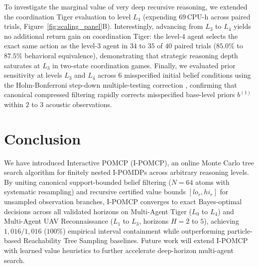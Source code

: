 To investigate the marginal value of very deep recursive reasoning, we extended the coordination Tiger evaluation to level $L_4$ (expending $69\,\text{CPU-h}$ across paired trials, Figure~\ref{fig:scaling_panel}B). Interestingly, advancing from $L_3$ to $L_4$ yields no additional return gain on coordination Tiger: the level-$4$ agent selects the exact same action as the level-$3$ agent in $34$ to $35$ of $40$ paired trials ($85.0\%$ to $87.5\%$ behavioral equivalence), demonstrating that strategic reasoning depth saturates at $L_3$ in two-state coordination games. Finally, we evaluated prior sensitivity at levels $L_3$ and $L_4$ across $6$ misspecified initial belief conditions using the Holm-Bonferroni step-down multiple-testing correction \citep{holm1979simple}, confirming that canonical compressed filtering rapidly corrects misspecified base-level priors $b^{(1)}$ within $2$ to $3$ acoustic observations.

\section{Conclusion}
\label{sec:conclusion}

We have introduced Interactive POMCP (I-POMCP), an online Monte Carlo tree search algorithm for finitely nested I-POMDPs across arbitrary reasoning levels. By uniting canonical support-bounded belief filtering ($N=64$ atoms with systematic resampling) and recursive certified value bounds $[lo_r, hi_r]$ for unsampled observation branches, I-POMCP converges to exact Bayes-optimal decisions across all validated horizons on Multi-Agent Tiger ($L_0$ to $L_4$) and Multi-Agent UAV Reconnaissance ($L_1$ to $L_3$, horizons $H=2$ to $5$), achieving $1{,}016/1{,}016$ ($100\%$) empirical interval containment while outperforming particle-based Reachability Tree Sampling baselines. Future work will extend I-POMCP with learned value heuristics to further accelerate deep-horizon multi-agent search.

